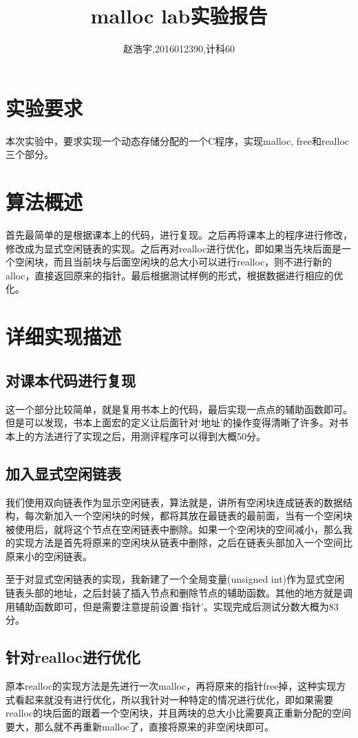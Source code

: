 \documentclass{article}
\title{\bf\huge malloc lab实验报告}
\author{赵浩宇,2016012390,计科60}
\theoremstyle{plain}
\theoremstyle{definition}
\theoremstyle{remark}
\begin{document}
    
    \maketitle

    \section{实验要求}
    本次实验中，要求实现一个动态存储分配的一个C程序，实现malloc, free和realloc三个部分。

    \section{算法概述}
    首先最简单的是根据课本上的代码，进行复现。之后再将课本上的程序进行修改，修改成为显式空闲链表的实现。之后再对realloc进行优化，即如果当先块后面是一个空闲块，而且当前块与后面空闲块的总大小可以进行realloc，则不进行新的alloc，直接返回原来的指针。最后根据测试样例的形式，根据数据进行相应的优化。

    \section{详细实现描述}
    \subsection{对课本代码进行复现}
    这一个部分比较简单，就是复用书本上的代码，最后实现一点点的辅助函数即可。但是可以发现，书本上面宏的定义让后面针对`地址'的操作变得清晰了许多。对书本上的方法进行了实现之后，用测评程序可以得到大概50分。

    \subsection{加入显式空闲链表}
    我们使用双向链表作为显示空闲链表，算法就是，讲所有空闲块连成链表的数据结构，每次新加入一个空闲块的时候，都将其放在最链表的最前面，当有一个空闲块被使用后，就将这个节点在空闲链表中删除。如果一个空闲块的空间减小，那么我的实现方法是首先将原来的空闲块从链表中删除，之后在链表头部加入一个空间比原来小的空闲链表。

    至于对显式空闲链表的实现，我新建了一个全局变量(unsigned int)作为显式空闲链表头部的地址，之后封装了插入节点和删除节点的辅助函数。其他的地方就是调用辅助函数即可，但是需要注意提前设置`指针'。实现完成后测试分数大概为83分。

    \subsection{针对realloc进行优化}
    原本realloc的实现方法是先进行一次malloc，再将原来的指针free掉，这种实现方式看起来就没有进行优化，所以我针对一种特定的情况进行优化，即如果需要realloc的块后面的跟着一个空闲块，并且两块的总大小比需要真正重新分配的空间要大，那么就不再重新malloc了，直接将原来的非空闲块即可。
\end{document}
